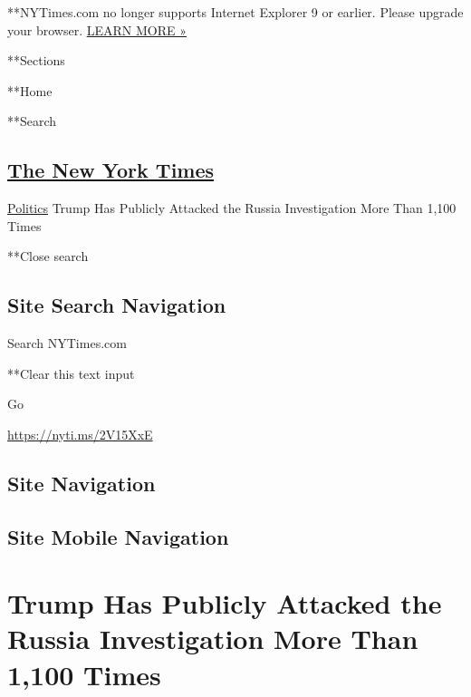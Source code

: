  **NYTimes.com no longer supports Internet Explorer 9 or earlier. Please
upgrade your browser.
\href{http://www.nytimes3xbfgragh.onion/content/help/site/ie9-support.html}{LEARN
MORE »}

**Sections

**Home

**Search

\hypertarget{the-new-york-times}{%
\subsection{\texorpdfstring{\href{http://www.nytimes3xbfgragh.onion/}{The
New York Times}}{The New York Times}}\label{the-new-york-times}}

 \href{/section/politics}{Politics} \textbar{}Trump Has Publicly
Attacked the Russia Investigation More Than 1,100 Times

**Close search

\hypertarget{site-search-navigation}{%
\subsection{Site Search Navigation}\label{site-search-navigation}}

Search NYTimes.com

**Clear this text input

Go

\url{https://nyti.ms/2V15XxE}

\hypertarget{site-navigation}{%
\subsection{Site Navigation}\label{site-navigation}}

\hypertarget{site-mobile-navigation}{%
\subsection{Site Mobile Navigation}\label{site-mobile-navigation}}

\hypertarget{trump-has-publicly-attacked-the-russia-investigation-more-than-1100-times}{%
\section{Trump Has Publicly Attacked the Russia Investigation More Than
1,100
Times}\label{trump-has-publicly-attacked-the-russia-investigation-more-than-1100-times}}

